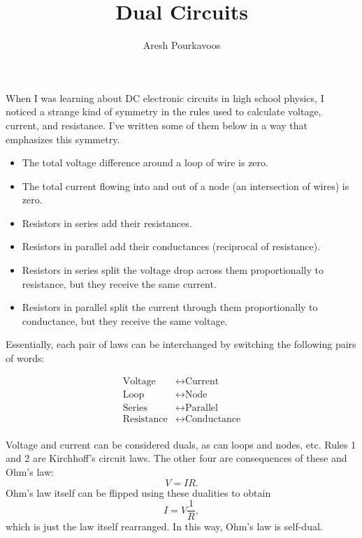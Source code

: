 \documentclass{article}
\begin{document}
\title{Dual Circuits}
\author{Aresh Pourkavoos}
\maketitle

When I was learning about DC electronic circuits in high school physics,
I noticed a strange kind of symmetry in the rules
used to calculate voltage, current, and resistance.
I've written some of them below in a way that emphasizes this symmetry.

\begin{itemize}
\item
  The total voltage difference around a loop of wire is zero.
\item
  The total current flowing into and out of a node (an intersection of wires) is zero.
\item
  Resistors in series add their resistances.
\item
  Resistors in parallel add their conductances (reciprocal of resistance).
\item
  Resistors in series split the voltage drop across them proportionally to resistance,
  but they receive the same current.
\item
  Resistors in parallel split the current through them proportionally to conductance,
  but they receive the same voltage.
\end{itemize}

Essentially, each pair of laws can be interchanged by switching the following pairs of words:

\begin{align*}
  \text{Voltage} & \leftrightarrow \text{Current} \\
  \text{Loop} & \leftrightarrow \text{Node} \\
  \text{Series} & \leftrightarrow \text{Parallel} \\
  \text{Resistance} & \leftrightarrow \text{Conductance} \\
\end{align*}

Voltage and current can be considered duals,
as can loops and nodes, etc.
Rules 1 and 2 are Kirchhoff's circuit laws.
The other four are consequences of these and Ohm's law:
\[V=IR.\]
Ohm's law itself can be flipped using these dualities to obtain
\[I=V\frac{1}{R},\]
which is just the law itself rearranged.
In this way, Ohm's law is self-dual.
\end{document}
